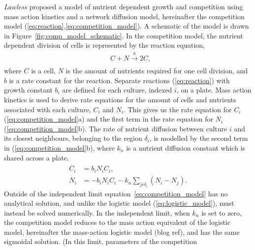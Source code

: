 \textit{Lawless} proposed a model of nutrient dependent growth and
competition using mass action kinetics and a network diffusion model,
hereinafter the competition model
(\ref{eq:reaction},\ref{eq:competition_model}). A schematic of the
model is drawn in Figure~\ref{fig:comp_model_schematic}. In the
competition model, the nutrient dependent division of cells is
represented by the reaction equation,
\begin{subequations}
  \label{eq:reaction}
  \begin{align}
    &C + N \xrightarrow[]{b} 2C,
  \end{align}
\end{subequations}
where \(C\) is a cell, \(N\) is the amount of nutrients required for
one cell division, and \(b\) is a rate constant for the
reaction. Separate reactions (\ref{eq:reaction}) with growth constant
\(b_{i}\) are defined for each culture, indexed \(i\), on a
plate. Mass action kinetics is used to derive rate equations for the
amount of cells and nutrients associated with each culture, \(C_{i}\)
and \(N_{i}\). This gives us the rate equation for \(C_{i}\)
(\ref{eq:competition_model}a) and the first term in the rate equation
for \(N_{i}\) (\ref{eq:competition_model}b). The rate of nutrient
diffusion between culture \(i\) and its closest neighbours, belonging
to the region \(\delta_{i}\), is modelled by the second term in
(\ref{eq:competition_model}b), where \(k_{n}\) is a nutrient diffusion
constant which is shared across a plate.
\begin{subequations}
  \label{eq:competition_model}
  \begin{align}
    \dot{C_{i}}& = b_{i}N_{i}C_{i},\\
    \dot{N_{i}}& = - b_{i}N_{i}C_{i} - k_{n}\sum_{j \epsilon \delta_i}(N_{i} - N_{j}).
  \end{align}
\end{subequations}
Outside of the independent limit equation~\ref{eq:competition_model}
has no analytical solution, and unlike the logistic model
(\ref{eq:logistic_model}), must instead be solved numerically. In the
independent limit, when \(k_{n}\) is set to zero, the competition
model reduces to the mass action equivalent of the logistic model,
hereinafter the mass-action logistic model (blog ref), and has the
same sigmoidal solution. (In this limit, parameters of the competition
